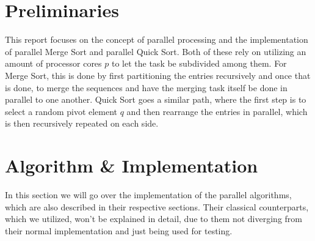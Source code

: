 \documentclass[twocolumn]{article}
\begin{document}
\section{Preliminaries}
This report focuses on the concept of parallel processing and the implementation of parallel Merge Sort and parallel Quick Sort. Both of these rely on utilizing an amount of processor cores $p$ to let the task be subdivided among them.
For Merge Sort, this is done by first partitioning the entries recursively and once that is done, to merge the sequences and have the merging task itself be done in parallel to one another.
Quick Sort goes a similar path, where the first step is to select a random pivot element $q$ and then rearrange the entries in parallel, which is then recursively repeated on each side.

\section{Algorithm \& Implementation}
In this section we will go over the implementation of the parallel algorithms, which are also described in their respective sections. Their classical counterparts, which we utilized, won't be explained in detail, due to them not diverging from their normal implementation and just being used for testing.
\end{document}
